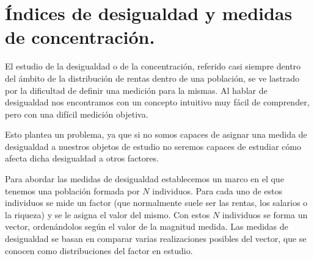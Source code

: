 \chapter[\'Indices de desigualdad y medidas de concentraci\'on.]{\'Indices de desigualdad y medidas de concentraci\'on.}


El estudio de la desigualdad o de la concentraci\'on, referido casi siempre dentro del \'ambito de la distribuci\'on de rentas dentro de una poblaci\'on, se ve lastrado por la dificultad de definir una medici\'on para la mismas. Al hablar de desigualdad nos encontramos con un concepto intuitivo muy f\'acil de comprender, pero con una dif\'icil medici\'on objetiva.

Esto plantea un problema, ya que si no somos capaces de asignar una medida de desigualdad a nuestros objetos de estudio no seremos capaces de estudiar c\'omo afecta dicha desigualdad a otros factores.


Para abordar las medidas de desigualdad establecemos un marco en el que tenemos una poblaci\'on formada por $N$ individuos. Para cada uno de estos individuos se mide un factor (que normalmente suele ser las rentas, los salarios o la riqueza) y se le asigna el valor del mismo. Con estos $N$ individuos se forma un vector, orden\'andolos seg\'un el valor de la magnitud medida. Las medidas de desigualdad se basan en comparar varias realizaciones posibles del vector, que se conocen como distribuciones del factor en estudio.


